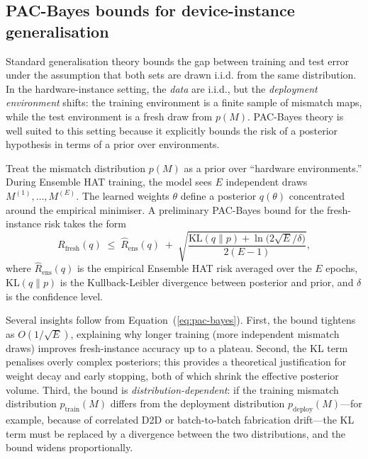 \subsection{PAC-Bayes bounds for device-instance generalisation}
\label{subsec:pac-bayes}

Standard generalisation theory bounds the gap between training and test error under the assumption that both sets are drawn i.i.d. from the same distribution.  In the hardware-instance setting, the \emph{data} are i.i.d., but the \emph{deployment environment} shifts: the training environment is a finite sample of mismatch maps, while the test environment is a fresh draw from $p(M)$.  PAC-Bayes theory is well suited to this setting because it explicitly bounds the risk of a posterior hypothesis in terms of a prior over environments.

Treat the mismatch distribution $p(M)$ as a prior over ``hardware environments.''  During Ensemble HAT training, the model sees $E$ independent draws $M^{(1)},\dots,M^{(E)}$.  The learned weights $\theta$ define a posterior $q(\theta)$ concentrated around the empirical minimiser.  A preliminary PAC-Bayes bound for the fresh-instance risk takes the form
\begin{equation}
    R_{\mathrm{fresh}}(q)
    \;\le\;
    \hat{R}_{\mathrm{ens}}(q)
    \;+\;
    \sqrt{\frac{\mathrm{KL}(q\|p) + \ln\bigl(2\sqrt{E}/\delta\bigr)}{2(E-1)}},
    \label{eq:pac-bayes}
\end{equation}
where $\hat{R}_{\mathrm{ens}}(q)$ is the empirical Ensemble HAT risk averaged over the $E$ epochs, $\mathrm{KL}(q\|p)$ is the Kullback-Leibler divergence between posterior and prior, and $\delta$ is the confidence level.

Several insights follow from Equation~(\ref{eq:pac-bayes}).  First, the bound tightens as $O(1/\sqrt{E})$, explaining why longer training (more independent mismatch draws) improves fresh-instance accuracy up to a plateau.  Second, the KL term penalises overly complex posteriors; this provides a theoretical justification for weight decay and early stopping, both of which shrink the effective posterior volume.  Third, the bound is \emph{distribution-dependent}: if the training mismatch distribution $p_{\mathrm{train}}(M)$ differs from the deployment distribution $p_{\mathrm{deploy}}(M)$---for example, because of correlated D2D or batch-to-batch fabrication drift---the KL term must be replaced by a divergence between the two distributions, and the bound widens proportionally.

